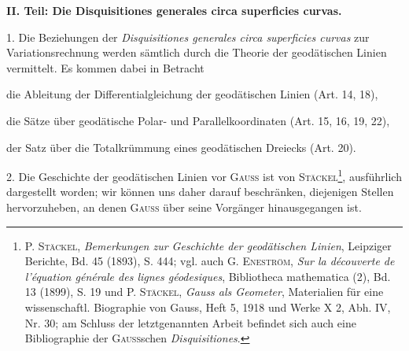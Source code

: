 \clearpage\begingroup\NoSourceHead{}
\renewcommand{\thefootnote}{\arabic{footnote})}\setcounter{footnote}{0}
\begin{center}\bfseries II. Teil: Die Disquisitiones generales circa superficies curvas.\end{center}
\noindent\hspace*{\parindent}1. Die Beziehungen der \textit{Disquisitiones generales circa superficies curvas} zur
Variationsrechnung werden sämtlich durch die Theorie der geodätischen Linien
vermittelt. Es kommen dabei in Betracht
\begin{list}{}{\setlength{\leftmargin}{2.8em}\setlength{\labelwidth}{1.8em}\setlength{\labelsep}{.5em}\setlength{\topsep}{0pt}\setlength{\itemsep}{0pt}\setlength{\parsep}{0pt}}
\item[1)] die Ableitung der Differentialgleichung der geodätischen Linien (Art. 14, 18),
\item[2)] die Sätze über geodätische Polar- und Parallelkoordinaten (Art. 15, 16, 19, 22),
\item[3)] der Satz über die Totalkrümmung eines geodätischen Dreiecks (Art. 20).
\end{list}
\begin{center}\end{center}
\noindent\hspace*{\parindent}2. Die Geschichte der geodätischen Linien vor \textsc{Gauss} ist von \textsc{Stäckel}\footnote{P. \textsc{Stäckel}, \textit{Bemerkungen zur Geschichte der geodätischen Linien}, Leipziger Berichte, Bd. 45 (1893),
S. 444; vgl. auch G. \textsc{Eneström}, \textit{Sur la découverte de l’équation générale des lignes géodesiques}, Bibliotheca
mathematica (2), Bd. 13 (1899), S. 19 und P. \textsc{Stäckel}, \textit{Gauss als Geometer}, Materialien für eine wissenschaftl.
Biographie von Gauss, Heft 5, 1918 und Werke X 2, Abh. IV, Nr. 30; am Schluss der letztgenannten Arbeit
befindet sich auch eine Bibliographie der \textsc{Gauss}schen \textit{Disquisitiones}.},
ausführlich dargestellt worden; wir können uns daher darauf beschränken, diejenigen
Stellen hervorzuheben, an denen \textsc{Gauss} über seine Vorgänger hinausgegangen
ist.

